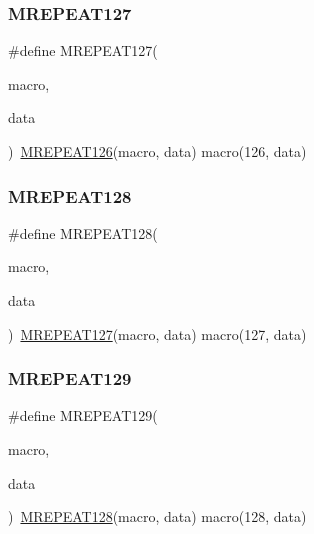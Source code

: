 \mbox{\label{group__group__sam0__utils__mrepeat_gaebe40c87c802115261cb83ff47e7a2e6}} 
\subsubsection{\texorpdfstring{MREPEAT127}{MREPEAT127}}
{\footnotesize\ttfamily \#define M\+R\+E\+P\+E\+A\+T127(\begin{DoxyParamCaption}\item[{}]{macro,  }\item[{}]{data }\end{DoxyParamCaption})~\mbox{\hyperlink{group__group__sam0__utils__mrepeat_ga53040b0cd4095d945f277af00a28a94d}{M\+R\+E\+P\+E\+A\+T126}}(macro, data)   macro(126, data)}

\mbox{\label{group__group__sam0__utils__mrepeat_ga932b04769d74272b98fbfe4d6c6e5f62}} 
\subsubsection{\texorpdfstring{MREPEAT128}{MREPEAT128}}
{\footnotesize\ttfamily \#define M\+R\+E\+P\+E\+A\+T128(\begin{DoxyParamCaption}\item[{}]{macro,  }\item[{}]{data }\end{DoxyParamCaption})~\mbox{\hyperlink{group__group__sam0__utils__mrepeat_gaebe40c87c802115261cb83ff47e7a2e6}{M\+R\+E\+P\+E\+A\+T127}}(macro, data)   macro(127, data)}

\mbox{\label{group__group__sam0__utils__mrepeat_ga7842d9600b24d29d82636afa3f0ca4b8}} 
\subsubsection{\texorpdfstring{MREPEAT129}{MREPEAT129}}
{\footnotesize\ttfamily \#define M\+R\+E\+P\+E\+A\+T129(\begin{DoxyParamCaption}\item[{}]{macro,  }\item[{}]{data }\end{DoxyParamCaption})~\mbox{\hyperlink{group__group__sam0__utils__mrepeat_ga932b04769d74272b98fbfe4d6c6e5f62}{M\+R\+E\+P\+E\+A\+T128}}(macro, data)   macro(128, data)}

